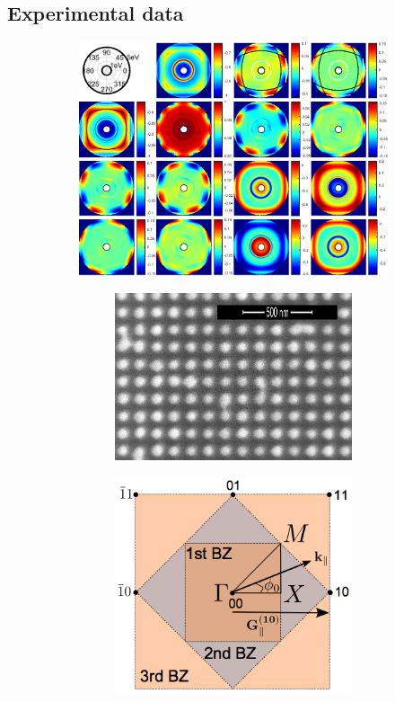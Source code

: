 \subsection{Experimental data}%
\begin{figure}
\begin{subfigure}{\textwidth}
    \centering
    \includegraphics[width=\linewidth]{figures/ch4/S6/exp/Muller_rot_S6_55.pdf}
\end{subfigure}
\begin{subfigure}{\textwidth}
\begin{subfigure}{0.49\textwidth}
        \flushright
        \includegraphics[width=0.6\linewidth]{figures/Ch3/S6_SEM(1).png} %
    \end{subfigure}
    \begin{subfigure}{0.49\textwidth}
        \flushleft
        \includegraphics[width=0.5\linewidth]{figures/Ch2/ReciprocalLattice.png}    %

\end{subfigure}
\end{subfigure}
\end{figure}
